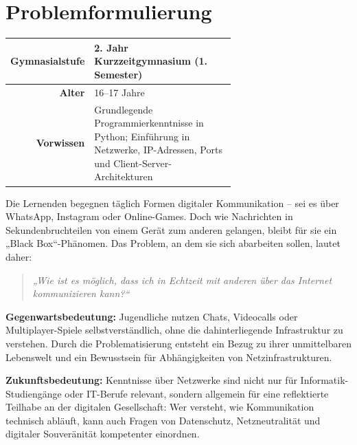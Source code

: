 \chapter{Problemformulierung}

\begin{tcolorbox}[colback=blue!5!white, colframe=blue!80!black, title=Kontext]
    \begin{table}[H]
        \centering
        \renewcommand{\arraystretch}{1.2}
        \begin{tabular}{@{}r|p{0.65\linewidth}@{}}
            \textbf{Gymnasialstufe} & 2. Jahr Kurzzeitgymnasium (1. Semester)                                                                                   \\
            \midrule
            \textbf{Alter}          & 16--17 Jahre                                                                                                               \\
            \midrule
            \textbf{Vorwissen}      & Grundlegende Programmierkenntnisse in Python; Einführung in Netzwerke, IP-Adressen, Ports und Client-Server-Architekturen \\
        \end{tabular}
    \end{table}
\end{tcolorbox}

Die Lernenden begegnen täglich Formen digitaler Kommunikation -- sei es über WhatsApp, Instagram oder Online-Games. Doch wie Nachrichten in Sekundenbruchteilen von einem Gerät zum anderen gelangen, bleibt für sie ein „Black Box“-Phänomen. Das Problem, an dem sie sich abarbeiten sollen, lautet daher:

\begin{quote}
    \textit{„Wie ist es möglich, dass ich in Echtzeit mit anderen über das Internet kommunizieren kann?“}
\end{quote}

\textbf{Gegenwartsbedeutung:} Jugendliche nutzen Chats, Videocalls oder Multiplayer-Spiele selbstverständlich, ohne die dahinterliegende Infrastruktur zu verstehen. Durch die Problematisierung entsteht ein Bezug zu ihrer unmittelbaren Lebenswelt und ein Bewusstsein für Abhängigkeiten von Netzinfrastrukturen.

\textbf{Zukunftsbedeutung:} Kenntnisse über Netzwerke sind nicht nur für Informatik-Studiengänge oder IT-Berufe relevant, sondern allgemein für eine reflektierte Teilhabe an der digitalen Gesellschaft: Wer versteht, wie Kommunikation technisch abläuft, kann auch Fragen von Datenschutz, Netzneutralität und digitaler Souveränität kompetenter einordnen.

